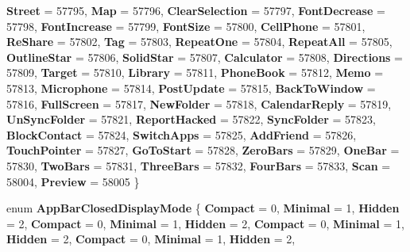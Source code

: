 \begin{DoxyCompactItemize}
{\bfseries Street} = 57795, 
{\bfseries Map} = 57796, 
{\bfseries Clear\+Selection} = 57797, 
\newline
{\bfseries Font\+Decrease} = 57798, 
{\bfseries Font\+Increase} = 57799, 
{\bfseries Font\+Size} = 57800, 
{\bfseries Cell\+Phone} = 57801, 
\newline
{\bfseries Re\+Share} = 57802, 
{\bfseries Tag} = 57803, 
{\bfseries Repeat\+One} = 57804, 
{\bfseries Repeat\+All} = 57805, 
\newline
{\bfseries Outline\+Star} = 57806, 
{\bfseries Solid\+Star} = 57807, 
{\bfseries Calculator} = 57808, 
{\bfseries Directions} = 57809, 
\newline
{\bfseries Target} = 57810, 
{\bfseries Library} = 57811, 
{\bfseries Phone\+Book} = 57812, 
{\bfseries Memo} = 57813, 
\newline
{\bfseries Microphone} = 57814, 
{\bfseries Post\+Update} = 57815, 
{\bfseries Back\+To\+Window} = 57816, 
{\bfseries Full\+Screen} = 57817, 
\newline
{\bfseries New\+Folder} = 57818, 
{\bfseries Calendar\+Reply} = 57819, 
{\bfseries Un\+Sync\+Folder} = 57821, 
{\bfseries Report\+Hacked} = 57822, 
\newline
{\bfseries Sync\+Folder} = 57823, 
{\bfseries Block\+Contact} = 57824, 
{\bfseries Switch\+Apps} = 57825, 
{\bfseries Add\+Friend} = 57826, 
\newline
{\bfseries Touch\+Pointer} = 57827, 
{\bfseries Go\+To\+Start} = 57828, 
{\bfseries Zero\+Bars} = 57829, 
{\bfseries One\+Bar} = 57830, 
\newline
{\bfseries Two\+Bars} = 57831, 
{\bfseries Three\+Bars} = 57832, 
{\bfseries Four\+Bars} = 57833, 
{\bfseries Scan} = 58004, 
\newline
{\bfseries Preview} = 58005
 \}
\item 
\mbox{\label{namespace_windows_1_1_u_i_1_1_xaml_1_1_controls_a69ed41c1bfc769995c091035ab6dd837}} 
enum {\bfseries App\+Bar\+Closed\+Display\+Mode} \{ \newline
{\bfseries Compact} = 0, 
{\bfseries Minimal} = 1, 
{\bfseries Hidden} = 2, 
{\bfseries Compact} = 0, 
\newline
{\bfseries Minimal} = 1, 
{\bfseries Hidden} = 2, 
{\bfseries Compact} = 0, 
{\bfseries Minimal} = 1, 
\newline
{\bfseries Hidden} = 2, 
{\bfseries Compact} = 0, 
{\bfseries Minimal} = 1, 
{\bfseries Hidden} = 2, 
\newline

\end{DoxyCompactItemize}
